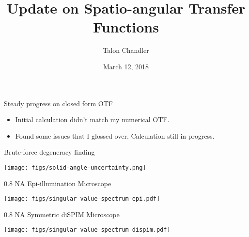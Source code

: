 \documentclass[presentation]{beamer}
\author{Talon Chandler}
\date{March 12, 2018}
\title{Update on Spatio-angular Transfer Functions}
\begin{document}
\maketitle
\begin{frame}[label=sec-1]{Steady progress on closed form OTF}
  \begin{itemize}
  \item Initial calculation didn't match my numerical OTF.
  \item Found some issues that I glossed over. Calculation still in progress.
  \end{itemize}
\end{frame}

\begin{frame}[label=sec-1]{Brute-force degeneracy finding}
 \begin{center}
   \texttt{[image: figs/solid-angle-uncertainty.png]}
 \end{center}
\end{frame}

\begin{frame}[label=sec-1]{0.8 NA Epi-illumination Microscope}
 \begin{center}
   \texttt{[image: figs/singular-value-spectrum-epi.pdf]}
 \end{center}
\end{frame}

\begin{frame}[label=sec-1]{0.8 NA Symmetric diSPIM Microscope}
 \begin{center}
   \texttt{[image: figs/singular-value-spectrum-dispim.pdf]}
 \end{center}
\end{frame}
\end{document}
